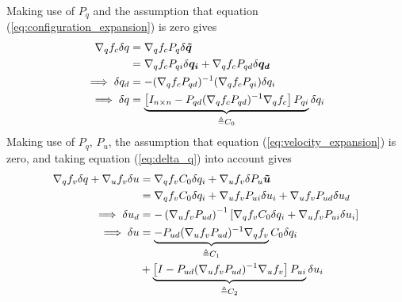 Making use of $P_q$ and the assumption that equation
(\ref{eq:configuration_expansion}) is zero gives
\begin{align}
\nabla_{q}f_{c} \delta q &= \nabla_{q}f_{c} P_{q} \delta \bm{\tilde{q}} \notag \\
   &= \nabla_{q}f_{c} P_{qi} \delta \bm{q_i} +
  \nabla_{q}f_{c} P_{qd} \delta \bm{q_d}\notag\\
  \implies \delta q_d &= -(\nabla_{q}f_{c} P_{qd})^{-1}
  (\nabla_{q}f_{c} P_{qi}) \delta q_i \notag\\
  \label{eq:delta_q}
  \implies \delta q &= \underbrace{\left[ I_{n \times n} - P_{qd}(\nabla_{q}
  f_{c} P_{qd})^{-1} \nabla_{q} f_{c} \right]
  P_{qi}}_{\triangleq C_0} \delta q_i
\end{align}
Making use of $P_q$, $P_u$, the assumption that equation
(\ref{eq:velocity_expansion}) is zero, and taking equation (\ref{eq:delta_q})
into account gives
\begin{align}
\nabla_{q}f_{v} \delta q + \nabla_{u}f_{v} \delta u
  &= \nabla_{q} f_{v} C_0 \delta q_i +\nabla_{u} f_{v}
  \delta P_u \bm{\tilde{u}} \notag \\
  &=\nabla_{q} f_{v} C_0 \delta q_i + \nabla_{u} f_{v} P_{ui} \delta u_i +
\nabla_{u} f_{v} P_{ud} \delta u_d \notag\\
%
\implies \delta u_d &= -\left(\nabla_{u} f_{v}
P_{ud}\right)^{-1}\left[\nabla_{q}f_{v} C_0 \delta q_i +
  \nabla_{u} f_{v} P_{ui} \delta u_i \right]\notag\\
  \implies \delta u &= \underbrace{-P_{ud}(\nabla_{u} f_{v} P_{ud})^{-1}
  \nabla_{q} f_{v}}_{\triangleq C_1} C_0 \delta q_i \notag\\
  \label{eq:delta_u}
  &+ \underbrace{\left[I - P_{ud} (\nabla_{u}f_{v} P_{ud})^{-1} \nabla_{u}
  f_{v} \right] P_{ui}}_{\triangleq C_2} \delta u_i
\end{align}

